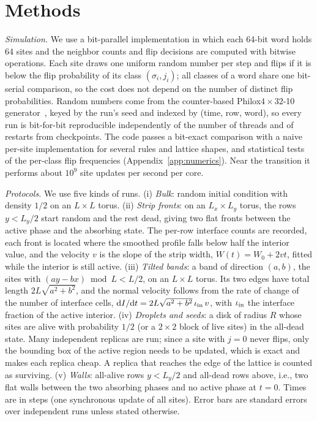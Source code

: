 \documentclass[pre,twocolumn,superscriptaddress,showpacs,floatfix]{revtex4-2}
\newcommand{\ds}{\mathrm{d}}
\begin{document}
\section{Methods}
\label{sec:methods}

\textit{Simulation.} We use a bit-parallel implementation in which each 64-bit word holds 64
sites and the neighbor counts and flip decisions are computed with bitwise operations. Each site
draws one uniform random number per step and flips if it is below the flip probability of its
class $(\sigma_i, j_i)$; all classes of a word share one bit-serial comparison, so the cost does
not depend on the number of distinct flip probabilities. Random numbers come from the
counter-based Philox$4\times 32$-10 generator~\cite{salmon2011}, keyed by the run's seed and
indexed by (time, row, word), so every run is bit-for-bit reproducible independently of the
number of threads and of restarts from checkpoints. The code passes a bit-exact comparison with a
naive per-site implementation for several rules and lattice shapes, and statistical tests of
the per-class flip frequencies (Appendix~\ref{app:numerics}). Near the transition it performs
about $10^9$ site updates per second per core.

\textit{Protocols.} We use five kinds of runs.
(i) \emph{Bulk}: random initial condition with density $1/2$ on an $L\times L$ torus.
(ii) \emph{Strip fronts}: on an $L_x\times L_y$ torus, the rows $y<L_y/2$ start random and the
rest dead, giving two flat fronts between the active phase and the absorbing state. The per-row
interface counts are recorded, each front is located where the smoothed profile falls below half
the interior value, and the velocity $v$ is the slope of the strip width, $W(t) = W_0 + 2vt$,
fitted while the interior is still active.
(iii) \emph{Tilted bands}: a band of direction $(a,b)$, the sites with
$(a y - b x)\bmod L < L/2$, on an $L\times L$ torus. Its two edges have total length
$2L\sqrt{a^2+b^2}$, and the normal velocity follows from the rate of change of the number of
interface cells, $\ds I/\ds t = 2L\sqrt{a^2+b^2}\,\iota_{\rm in}\,v$, with $\iota_{\rm in}$ the
interface fraction of the active interior.
(iv) \emph{Droplets and seeds}: a disk of radius $R$ whose sites are alive with probability $1/2$
(or a $2\times 2$ block of live sites) in the all-dead state. Many independent replicas are run;
since a site with $j = 0$ never flips, only the bounding box of the active region needs to be
updated, which is exact and makes each replica cheap. A replica that reaches the edge of the
lattice is counted as surviving.
(v) \emph{Walls}: all-alive rows $y<L_y/2$ and all-dead rows above, i.e., two flat walls between
the two absorbing phases and no active phase at $t = 0$.
Times are in steps (one synchronous update of all sites). Error bars are standard errors over
independent runs unless stated otherwise.
\end{document}
